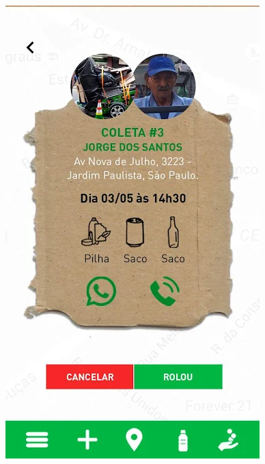 \documentclass[
	12pt,				%
	openany,			%
	twoside,			%
	a4paper,			%
	english,			%
	french,				%
	spanish,			%
	brazil				%
	]{abntex2}
\begin{document}
\begin{figure}[htb]
\begin{minipage}{0.45\textwidth}
    \includegraphics[scale=0.45]{media/infocatador.png}
     \label{fig:figura2}
  \end{minipage}
\end{figure}
\end{document}
